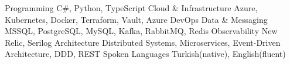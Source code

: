 

\begin{cvskills}

  \cvskill
    {Programming} %
    {C\#, Python, TypeScript } %
  \cvskill
    {Cloud \& Infrastructure}
    {Azure, Kubernetes, Docker, Terraform, Vault, Azure DevOps}
  \cvskill
    {Data \& Messaging}
    {MSSQL, PostgreSQL, MySQL, Kafka, RabbitMQ, Redis}
  \cvskill
    {Observability}
    {New Relic, Serilog}
  \cvskill
    {Architecture}
    {Distributed Systems, Microservices, Event-Driven Architecture, DDD, REST}
  \cvskill
    {Spoken Languages}
    {Turkish(native), English(fluent)}
\end{cvskills}